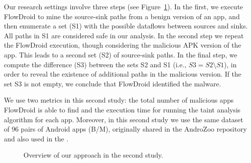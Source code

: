 Our research settings involve three steps (see Figure~\ref{fig:settings2}).
In the first, we execute FlowDroid to mine the source-sink paths from a
benign version of an app, and then enumerate a set (S1) with the 
possible dataflows between sources and sinks. All paths in S1 are considered safe in
our analysis. In the second step we repeat the FlowDroid execution, though
considering the malicious APK version of the app. This leads to a second set (S2) of source-sink paths. In the final step, we compute the difference (S3) between
the sets S2 and S1 (i.e., $S3 = S2 \setminus S1$), in order to reveal
the existence of additional paths in the
malicious version. If the set S3 is not empty, we conclude that FlowDroid
identified the malware. 


We use two metrics in this second study:
the total number of malicious apps FlowDroid is able to find and the
execution time for running the taint analysis algorithm for each app.
Moreover, in this second study we use the same dataset of $96$ pairs of Android apps (B/M),
originally shared in the AndroZoo repository~\cite{DBLP:conf/msr/AllixBKT16} and
also used in the \blls. 



\begin{figure}
  \caption{Overview of our approach in the second study.}
  \label{fig:settings2}
\end{figure}







